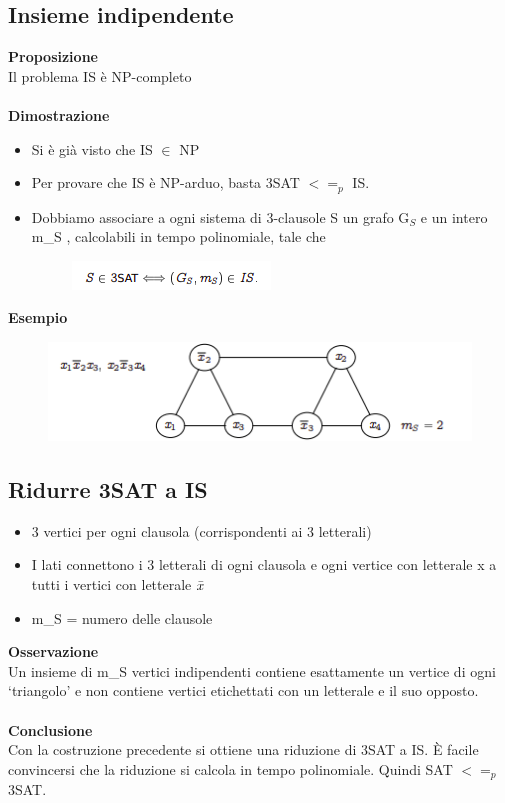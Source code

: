 \subsection{Insieme indipendente}
\textbf{Proposizione}\\
Il problema IS è NP-completo\\\\
\textbf{Dimostrazione}
\begin{itemize}
    \item Si è già visto che IS $\in$ NP
    
    \item Per provare che IS è NP-arduo, basta 3SAT $<=_p$ IS.
    
    \item Dobbiamo associare a ogni sistema di 3-clausole S un grafo  G$_S$ e un intero m\_S , calcolabili in tempo polinomiale, tale che
    
    \begin{center}
        \begin{figure}[htp]
            \centering
            \includegraphics[scale=0.9]{tesi_stile/img/foto1cap13.png}
        \end{figure}
    \end{center}
\end{itemize}
\textbf{Esempio}\\
\begin{figure}[htp]
    \centering
    \includegraphics[scale=0.9]{tesi_stile/img/foto2cap13.png}
\end{figure}
\subsection{Ridurre 3SAT a IS}
\begin{itemize}
    \item 3 vertici per ogni clausola (corrispondenti ai 3 letterali)
    
    \item I lati connettono i 3 letterali di ogni clausola e ogni vertice con letterale x a tutti i vertici con letterale $\Bar{x}$
    
    \item m\_S = numero delle clausole
\end{itemize}
\textbf{Osservazione}\\
Un insieme di m\_S vertici indipendenti contiene esattamente un vertice di
ogni ‘triangolo’ e non contiene vertici etichettati con un letterale e il suo
opposto.\\\\
\textbf{Conclusione}\\
Con la costruzione precedente si ottiene una riduzione di 3SAT a IS.
È facile convincersi che la riduzione si calcola in tempo polinomiale.
Quindi SAT $<=_p$ 3SAT.
